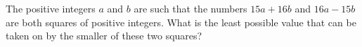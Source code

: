 The positive integers $ a$ and $ b$ are such that the numbers  $ 15a + 16b$ and $ 16a - 15b$
 are both squares of positive integers. What is the least possible value
 that can be taken on by the smaller of these two squares?
